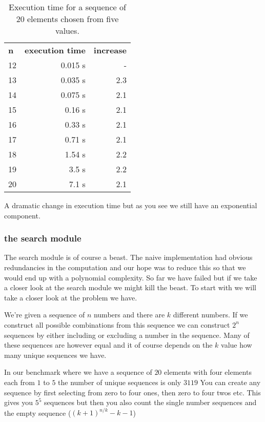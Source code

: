 \documentclass[a4paper,11pt]{article}
\begin{document}
\begin{table}[h!]
  \begin{center}
    \begin{tabular}{l|r|r}
      \textbf{n} & \textbf{execution time} & \textbf{increase}\\
12	 &0.015 s&- \\ 
13	 &0.035 s&2.3 \\ 
14	 &0.075 s&2.1 \\ 
15	 &0.16 s&2.1 \\ 
16	 &0.33 s&2.1 \\ 
17	 &0.71 s&2.1 \\ 
18	 &1.54 s&2.2 \\ 
19	 &3.5 s&2.2 \\ 
20	 &7.1 s &2.1 \\ 
    \end{tabular}
    \caption{Execution time for a sequence of 20 elements chosen from five values.}
  \end{center}
\end{table}                               

A dramatic change in execution time but as you see we still have an
exponential component. 

\subsubsection*{the search module}

The search module is of course a beast. The naive implementation had
obvious redundancies in the computation and our hope was to reduce
this so that we would end up with a polynomial complexity. So far we
have failed but if we take a closer look at the search module we might
kill the beast. To start with we will take a closer look at the
problem we have.

We're given a sequence of $n$ numbers and there are $k$ different
numbers. If we construct all possible combinations from this sequence
we can construct $2^n$ sequences by either including or excluding a
number in the sequence. Many of these sequences are however equal and
it of course depends on the $k$ value how many unique sequences we
have.

In our benchmark where we have a sequence of $20$ elements with four
elements each from $1$ to $5$ the number of unique sequences is only $3119$ 
You can create any sequence by first selecting from zero to four ones,
then zero to four twos etc. This gives you $5^5$ sequences but then
you also count the single number sequences and the empty sequence ($(k+1)^{n/k} - k - 1$)
\end{document}
